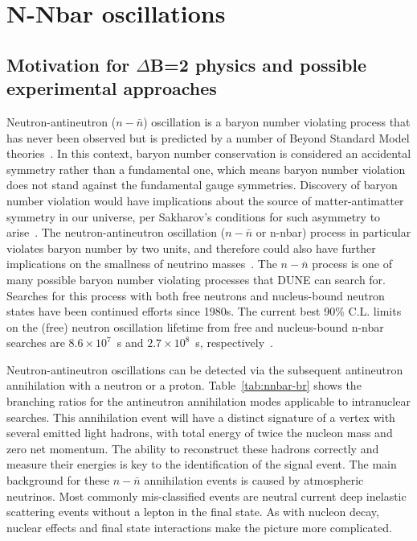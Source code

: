 \section{N-Nbar oscillations}
\label{sec:nonaccel-nnbar}

\subsection{Motivation for $\Delta$B=2 physics and possible experimental approaches}
\label{subsec:nonaccel-nnbar-intro}

Neutron-antineutron ($n - \bar{n}$) oscillation is a baryon number violating process that
has never been observed but is predicted by a number of Beyond Standard Model
theories~\cite{Phillips:2014fgb}. In this context, baryon number conservation is considered an accidental
symmetry rather than a fundamental one, which means baryon number violation
does not stand against the fundamental gauge symmetries. Discovery of baryon
number violation would have implications about the source of matter-antimatter
symmetry in our universe, per Sakharov's conditions for such asymmetry to arise~\cite{Sakharov:1967dj}.
The neutron-antineutron oscillation ($n-\bar{n}$ or n-nbar) process in particular violates
baryon number by two units, and therefore could also have further implications on
the smallness of neutrino masses~\cite{Phillips:2014fgb}. The $n - \bar{n}$ process is one of many possible baryon number violating processes that DUNE can search for. Searches for this process with
both free neutrons and nucleus-bound neutron states have been continued efforts
since 1980s. The current best 90\% C.L. limits on the (free) neutron oscillation
lifetime from free and nucleus-bound n-nbar searches are $8.6\times10^7$~s and $2.7\times 10^8$~s, respectively~\cite{BaldoCeolin:1994jz,Abe:2011ky}.

Neutron-antineutron oscillations can be detected via the subsequent antineutron annihilation with a neutron or a proton. Table~\ref{tab:nnbar-br} shows the branching ratios for the antineutron annihilation modes applicable to intranuclear searches.  This annihilation event will have a distinct signature of a vertex with several emitted light hadrons, with total energy of twice the nucleon mass and zero net momentum. The ability to reconstruct these hadrons correctly and measure their energies is key to the identification of the signal event. The main background for these $n - \bar{n}$ annihilation events is caused by atmospheric neutrinos. Most commonly mis-classified events are neutral current deep inelastic scattering events without a lepton in the final state. As with nucleon decay, nuclear effects and final state interactions make the picture more complicated.


